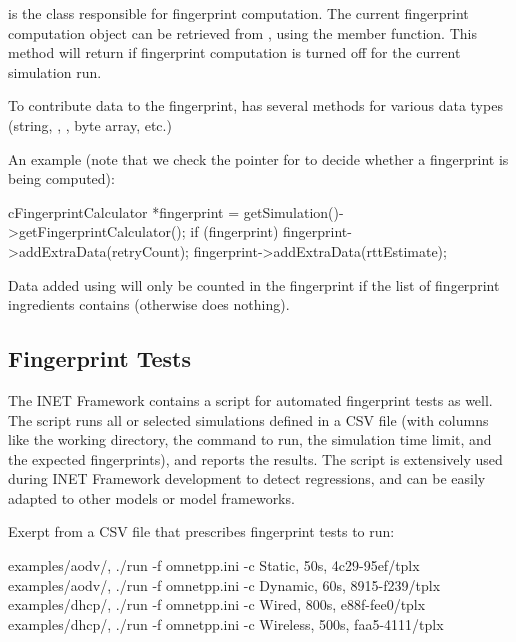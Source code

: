  is the class responsible for fingerprint computation.
The current fingerprint computation object can be retrieved from
, using the  member function.
This method will return  if fingerprint computation is turned
off for the current simulation run.

To contribute data to the fingerprint,  has several
 methods for various data types (string, ,
, byte array, etc.)

An example (note that we check the pointer for  to decide
whether a fingerprint is being computed):

\begin{cpp}
cFingerprintCalculator *fingerprint = getSimulation()->getFingerprintCalculator();
if (fingerprint) {
    fingerprint->addExtraData(retryCount);
    fingerprint->addExtraData(rttEstimate);
}
\end{cpp}

Data added using  will only be counted in the
fingerprint if the list of fingerprint ingredients contains 
(otherwise  does nothing).

\subsection{Fingerprint Tests}
\label{sec:testing:creating-fingerprint-tests}

The INET Framework contains a script for automated fingerprint tests as
well. The script runs all or selected simulations defined in a CSV file
(with columns like the working directory, the command to run, the
simulation time limit, and the expected fingerprints), and reports the
results. The script is extensively used during INET Framework development
to detect regressions, and can be easily adapted to other models or model
frameworks.

Exerpt from a CSV file that prescribes fingerprint tests to run:

\begin{filelisting}
examples/aodv/, ./run -f omnetpp.ini -c Static,   50s,  4c29-95ef/tplx
examples/aodv/, ./run -f omnetpp.ini -c Dynamic,  60s,  8915-f239/tplx
examples/dhcp/, ./run -f omnetpp.ini -c Wired,    800s, e88f-fee0/tplx
examples/dhcp/, ./run -f omnetpp.ini -c Wireless, 500s, faa5-4111/tplx
\end{filelisting}


